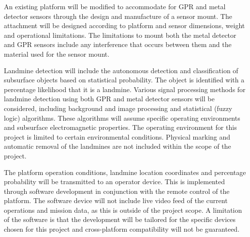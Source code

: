 \documentclass[main.tex]{subfiles}
\begin{document}
An existing platform will be modified to accommodate for GPR and metal detector sensors through the design and manufacture of a sensor mount. The attachment will be designed according to platform and sensor dimensions, weight and operational limitations. The limitations to mount both the metal detector and GPR sensors include any interference that occurs between them and the material used for the sensor mount.

Landmine detection will include the autonomous detection and classification of subsurface objects based on statistical probability. The object is identified with a percentage likelihood that it is a landmine. Various signal processing methods for landmine detection using both GPR and metal detector sensors will be considered, including background and image processing and statistical (fuzzy logic) algorithms. These algorithms will assume specific operating environments and subsurface electromagnetic properties. The operating environment for this project is limited to certain environmental conditions. Physical marking and automatic removal of the landmines are not included within the scope of the project.

The platform operation conditions, landmine location coordinates and percentage probability will be transmitted to an operator device. This is implemented through software development in conjunction with the remote control of the platform. The software device will not include live video feed of the current operations and mission data, as this is outside of the project scope. A limitation of the software is that the development will be tailored for the specific devices chosen for this project and cross-platform compatibility will not be guaranteed.
 
\end{document}
